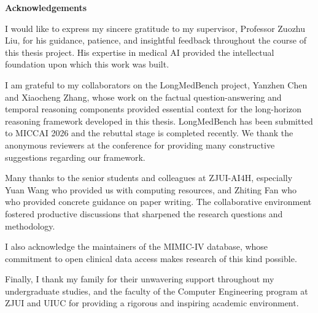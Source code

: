 \centerline{\xiaoyi\bfseries Acknowledgements}

I would like to express my sincere gratitude to my supervisor, Professor Zuozhu Liu, for his guidance, patience, and insightful feedback throughout the course of this thesis project. His expertise in medical AI provided the intellectual foundation upon which this work was built.

I am grateful to my collaborators on the LongMedBench project, Yanzhen Chen and Xiaocheng Zhang, whose work on the factual question-answering and temporal reasoning components provided essential context for the long-horizon reasoning framework developed in this thesis. LongMedBench has been submitted to MICCAI 2026 and the rebuttal stage is completed recently. We thank the anonymous reviewers at the conference for providing many constructive suggestions regarding our framework.

Many thanks to the senior students and colleagues at ZJUI-AI4H, especially Yuan Wang who provided us with computing resources, and Zhiting Fan who who provided concrete guidance on paper writing. The collaborative environment fostered productive discussions that sharpened the research questions and methodology.

I also acknowledge the maintainers of the MIMIC-IV database, whose commitment to open clinical data access makes research of this kind possible.

Finally, I thank my family for their unwavering support throughout my undergraduate studies, and the faculty of the Computer Engineering program at ZJUI and UIUC for providing a rigorous and inspiring academic environment.
